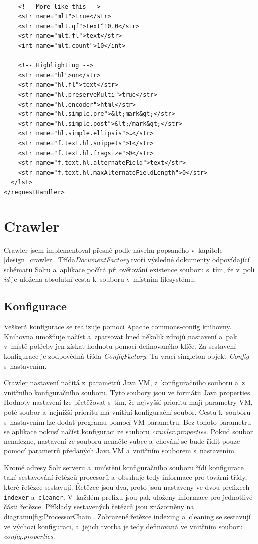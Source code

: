 \begin{verbatim}
    
    <!-- More like this -->
    <str name="mlt">true</str>
    <str name="mlt.qf">text^10.0</str>
    <str name="mlt.fl">text</str>
    <int name="mlt.count">10</int>
    
    <!-- Highlighting -->
    <str name="hl">on</str>
    <str name="hl.fl">text</str>
    <str name="hl.preserveMulti">true</str>
    <str name="hl.encoder">html</str>
    <str name="hl.simple.pre">&lt;mark&gt;</str>
    <str name="hl.simple.post">&lt;/mark&gt;</str>
    <str name="hl.simple.ellipsis">…</str>
    <str name="f.text.hl.snippets">1</str>
    <str name="f.text.hl.fragsize">0</str>
    <str name="f.text.hl.alternateField">text</str>
    <str name="f.text.hl.maxAlternateFieldLength">0</str>
  </lst>
</requestHandler>
\end{verbatim}

\section{Crawler}
Crawler jsem implementoval přesně podle návrhu popsaného v~kapitole \ref{design_crawler}. Třída\emph{DocumentFactory} tvoří výsledné dokumenty odpovídající schématu Solru a~aplikace počítá při ověřování existence souboru s~tím, že v~poli \emph{id} je uložena absolutní cesta k~souboru v~místním filesystému.

\subsection{Konfigurace}
Veškerá konfigurace se realizuje pomocí Apache commons-config knihovny. Knihovna umožňuje načíst a~zparsovat hned několik zdrojů nastavení a~pak v~místě potřeby jen získat hodnotu pomocí definovaného klíče. Za sestavení konfigurace je zodpovědná třída \emph{ConfigFactory}. Ta vrací singleton objekt \emph{Config} s~nastavením.

Crawler nastavení načítá z~parametrů Java VM, z~konfiguračního souboru a~z vnitřního konfiguračního souboru. Tyto soubory jsou ve formátu Java properties. Hodnoty nastavení lze přetěžovat s~tím, že nejvyšší prioritu mají parametry VM, poté soubor a~nejnižší prioritu má vnitřní konfigurační soubor. Cestu k~souboru s~nastavením lze dodat programu pomocí VM parametru. Bez tohoto parametru se aplikace pokusí načíst konfiguraci ze souboru \emph{crawler.properties}. Pokud soubor nenalezne, nastavení ze souboru nenačte vůbec a~chování se bude řídit pouze pomocí parametrů předaných Java VM a~vnitřním souborem s~nastavením.

Kromě adresy Solr serveru a~umístění konfiguračního souboru řídí konfigurace také sestavování  řetězců procesorů a~obsahuje tedy informace pro tovární třídy, které řetězce sestavují. Řetězce jsou dva, proto jsou nastaveny ve dvou prefixech \verb|indexer| a~\verb|cleaner|. V~každém prefixu jsou pak uloženy informace pro jednotlivé části řetězce. Příklady sestavených řetězců jsou znázorněny na diagramu\ref{fig:ProcessorChain}. Zobrazené řetězce indexing a~cleaning se sestavují ve výchozí konfiguraci, a~jejich tvorba je tedy definovaná ve vnitřním souboru \emph{config.properties}.

